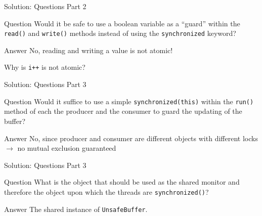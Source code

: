 \begin{frame}{Solution: Questions Part 2}
  \begin{block}{Question}
    Would it be safe to use a boolean variable as a ``guard'' within
    the \lstinline!read()! and \lstinline!write()! methods instead of
    using the \lstinline!synchronized!  keyword?
  \end{block}


  \pause

  \begin{exampleblock}{Answer}
    No, reading and writing a value is not atomic!

    Why is \lstinline!i++! is not atomic?
  \end{exampleblock}
\end{frame}

\begin{frame}{Solution: Questions Part 3}
  \begin{block}{Question}
    Would it suffice to use a simple \lstinline!synchronized(this)!
    within the \lstinline!run()! method of each the producer and the
    consumer to guard the updating of the buffer?
  \end{block}


  \pause

  \begin{exampleblock}{Answer}
    No, since producer and consumer are different objects with
    different locks $\rightarrow$ no mutual exclusion guaranteed
  \end{exampleblock}
\end{frame}

\begin{frame}{Solution: Questions Part 3}
  \begin{block}{Question}
    What is the object that should be used as the shared monitor and
    therefore the object upon which the threads are
    \lstinline!synchronized()!?
  \end{block}


  \pause

  \begin{exampleblock}{Answer}
    The shared instance of \lstinline!UnsafeBuffer!.
  \end{exampleblock}
\end{frame}

